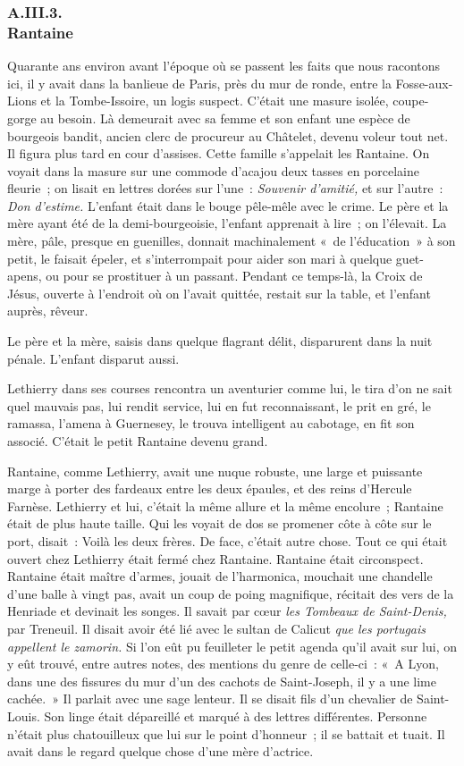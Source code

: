 \documentclass[french,twoside]{book} %
\begin{document}
 \subsubsection[{A.III.3. Rantaine}]{A.III.3. \\
Rantaine}
\noindent Quarante ans environ avant l’époque où se passent les faits que nous racontons ici, il y avait dans la banlieue de Paris, près du mur de ronde, entre la Fosse-aux-Lions et la Tombe-Issoire, un logis suspect. C’était une masure isolée, coupe-gorge au besoin. Là demeurait avec sa femme et son enfant une espèce de bourgeois bandit, ancien clerc de procureur au Châtelet, devenu voleur tout net. Il figura plus tard en cour d’assises. Cette famille s’appelait les Rantaine. On voyait dans la masure sur une commode d’acajou deux tasses en porcelaine fleurie ; on lisait en lettres dorées sur l’une : \emph{Souvenir d’amitié,} et sur l’autre : \emph{Don d’estime.} L’enfant était dans le bouge pêle-mêle avec le crime. Le père et la mère ayant été de la demi-bourgeoisie, l’enfant apprenait à lire ; on l’élevait. La mère, pâle, presque en guenilles, donnait machinalement « de l’éducation » à son petit, le faisait épeler, et s’interrompait pour aider son mari à quelque guet-apens, ou pour se prostituer à un passant. Pendant  ce temps-là, la Croix de Jésus, ouverte à l’endroit où on l’avait quittée, restait sur la table, et l’enfant auprès, rêveur.\par
Le père et la mère, saisis dans quelque flagrant délit, disparurent dans la nuit pénale. L’enfant disparut aussi.\par
Lethierry dans ses courses rencontra un aventurier comme lui, le tira d’on ne sait quel mauvais pas, lui rendit service, lui en fut reconnaissant, le prit en gré, le ramassa, l’amena à Guernesey, le trouva intelligent au cabotage, en fit son associé. C’était le petit Rantaine devenu grand.\par
Rantaine, comme Lethierry, avait une nuque robuste, une large et puissante marge à porter des fardeaux entre les deux épaules, et des reins d’Hercule Farnèse. Lethierry et lui, c’était la même allure et la même encolure ; Rantaine était de plus haute taille. Qui les voyait de dos se promener côte à côte sur le port, disait : Voilà les deux frères. De face, c’était autre chose. Tout ce qui était ouvert chez Lethierry était fermé chez Rantaine. Rantaine était circonspect. Rantaine était maître d’armes, jouait de l’harmonica, mouchait une chandelle d’une balle à vingt pas, avait un coup de poing magnifique, récitait des vers de la Henriade et devinait les songes. Il savait par cœur \emph{les Tombeaux de Saint-Denis,} par Treneuil. Il disait avoir été lié avec le sultan de Calicut \emph{que les portugais appellent le zamorin.} Si l’on eût pu feuilleter le petit agenda qu’il avait sur lui, on y eût trouvé, entre autres notes, des mentions du genre de celle-ci : « A Lyon,  dans une des fissures du mur d’un des cachots de Saint-Joseph, il y a une lime cachée. » Il parlait avec une sage lenteur. Il se disait fils d’un chevalier de Saint-Louis. Son linge était dépareillé et marqué à des lettres différentes. Personne n’était plus chatouilleux que lui sur le point d’honneur ; il se battait et tuait. Il avait dans le regard quelque chose d’une mère d’actrice.\par
\end{document}
